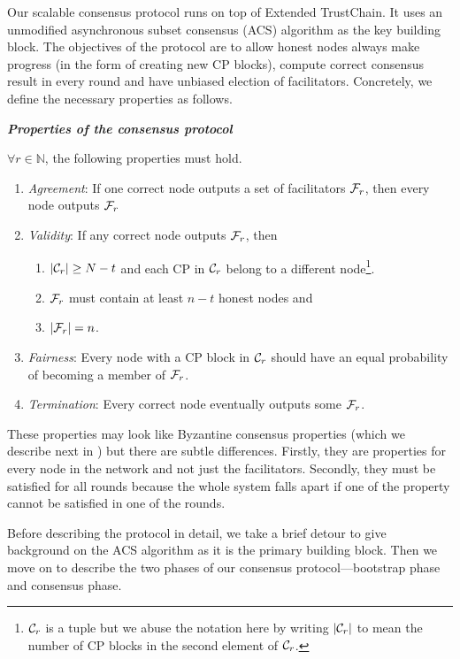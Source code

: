 Our scalable consensus protocol runs on top of Extended TrustChain.
It uses an unmodified asynchronous subset consensus (ACS) algorithm as the key building block.
The objectives of the protocol are to
    allow honest nodes always make progress (in the form of creating new CP blocks),
    compute correct consensus result in every round
    and have unbiased election of facilitators.
Concretely, we define the necessary properties as follows.
\begin{definition}
\label{def:consensus}
\textbf{\emph{Properties of the consensus protocol}}

$\forall r \in \mathbb{N}$, the following properties must hold.
\begin{enumerate}
    \item \emph{Agreement}:
        If one correct node outputs a set of facilitators $\mathcal{F}_r$,
        then every node outputs $\mathcal{F}_r$
    \item \emph{Validity}:
        If any correct node outputs $\mathcal{F}_r$, then 
            \begin{enumerate}
                \item $|\mathcal{C}_r| \ge N - t$ and each CP in $\mathcal{C}_r$ belong to a different node\footnote{
                $\mathcal{C}_r$ is a tuple but we abuse the notation here by writing $|\mathcal{C}_r|$ to mean the number of CP blocks in the second element of $\mathcal{C}_r$.}.
                \item $\mathcal{F}_r$ must contain at least $n - t$ honest nodes and
                \item $|\mathcal{F}_r| = n$.
            \end{enumerate}
    \item \emph{Fairness}:
        Every node with a CP block in $\mathcal{C}_r$ should have an equal probability of becoming a member of $\mathcal{F}_r$.
    \item \emph{Termination}:
        Every correct node eventually outputs some $\mathcal{F}_r$.
\end{enumerate}
\end{definition}
These properties may look like Byzantine consensus properties (which we describe next in ) but there are subtle differences.
Firstly, they are properties for every node in the network and not just the facilitators.
Secondly, they must be satisfied for all rounds because the whole system falls apart if one of the property cannot be satisfied in one of the rounds.

Before describing the protocol in detail,
we take a brief detour to give background on the ACS algorithm as it is the primary building block.
Then we move on to describe the two phases of our consensus protocol---bootstrap phase and consensus phase.

